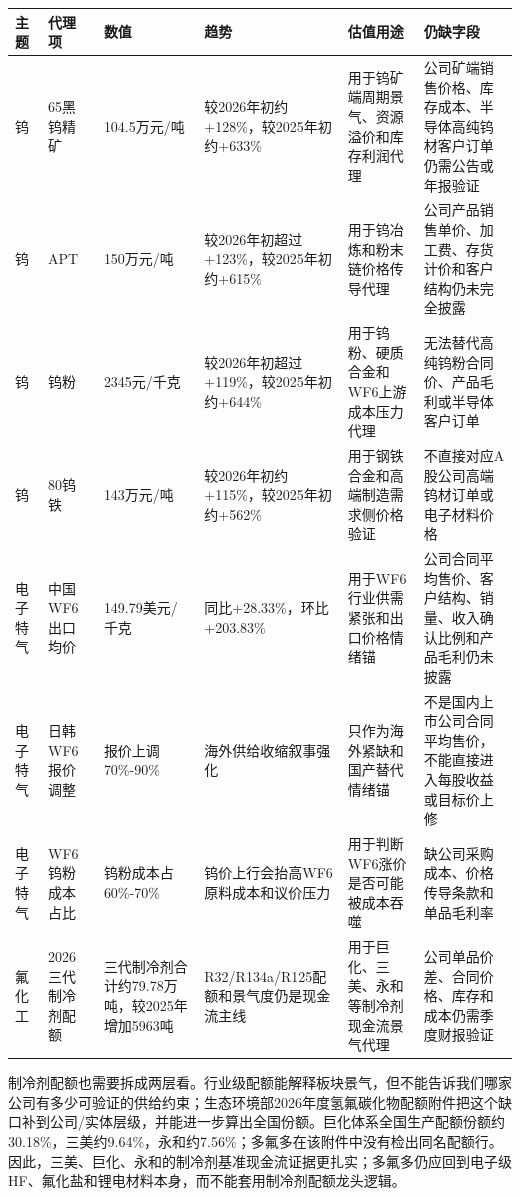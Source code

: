 \begin{exhibitbox}
\footnotesize
\begin{tabularx}{\exhibitboxwidth}{L{1.0cm} L{1.7cm} L{1.8cm} X X X}
\toprule
\textbf{主题} & \textbf{代理项} & \textbf{数值} & \textbf{趋势} & \textbf{估值用途} & \textbf{仍缺字段} \\
\midrule
钨 & 65黑钨精矿 & 104.5万元/吨 & 较2026年初约+128\%，较2025年初约+633\% & 用于钨矿端周期景气、资源溢价和库存利润代理 & 公司矿端销售价格、库存成本、半导体高纯钨材客户订单仍需公告或年报验证 \\
钨 & APT & 150万元/吨 & 较2026年初超过+123\%，较2025年初约+615\% & 用于钨冶炼和粉末链价格传导代理 & 公司产品销售单价、加工费、存货计价和客户结构仍未完全披露 \\
钨 & 钨粉 & 2345元/千克 & 较2026年初超过+119\%，较2025年初约+644\% & 用于钨粉、硬质合金和WF6上游成本压力代理 & 无法替代高纯钨粉合同价、产品毛利或半导体客户订单 \\
钨 & 80钨铁 & 143万元/吨 & 较2026年初约+115\%，较2025年初约+562\% & 用于钢铁合金和高端制造需求侧价格验证 & 不直接对应A股公司高端钨材订单或电子材料价格 \\
电子特气 & 中国WF6出口均价 & 149.79美元/千克 & 同比+28.33\%，环比+203.83\% & 用于WF6行业供需紧张和出口价格情绪锚 & 公司合同平均售价、客户结构、销量、收入确认比例和产品毛利仍未披露 \\
电子特气 & 日韩WF6报价调整 & 报价上调70\%-90\% & 海外供给收缩叙事强化 & 只作为海外紧缺和国产替代情绪锚 & 不是国内上市公司合同平均售价，不能直接进入每股收益或目标价上修 \\
电子特气 & WF6钨粉成本占比 & 钨粉成本占60\%-70\% & 钨价上行会抬高WF6原料成本和议价压力 & 用于判断WF6涨价是否可能被成本吞噬 & 缺公司采购成本、价格传导条款和单品毛利率 \\
氟化工 & 2026三代制冷剂配额 & 三代制冷剂合计约79.78万吨，较2025年增加5963吨 & R32/R134a/R125配额和景气度仍是现金流主线 & 用于巨化、三美、永和等制冷剂现金流景气代理 & 公司单品价差、合同价格、库存和成本仍需季度财报验证 \\
\bottomrule
\end{tabularx}
\end{exhibitbox}

制冷剂配额也需要拆成两层看。行业级配额能解释板块景气，但不能告诉我们哪家公司有多少可验证的供给约束；生态环境部2026年度氢氟碳化物配额附件把这个缺口补到公司/实体层级，并能进一步算出全国份额。巨化体系全国生产配额份额约30.18\%，三美约9.64\%，永和约7.56\%；多氟多在该附件中没有检出同名配额行。因此，三美、巨化、永和的制冷剂基准现金流证据更扎实；多氟多仍应回到电子级HF、氟化盐和锂电材料本身，而不能套用制冷剂配额龙头逻辑。

